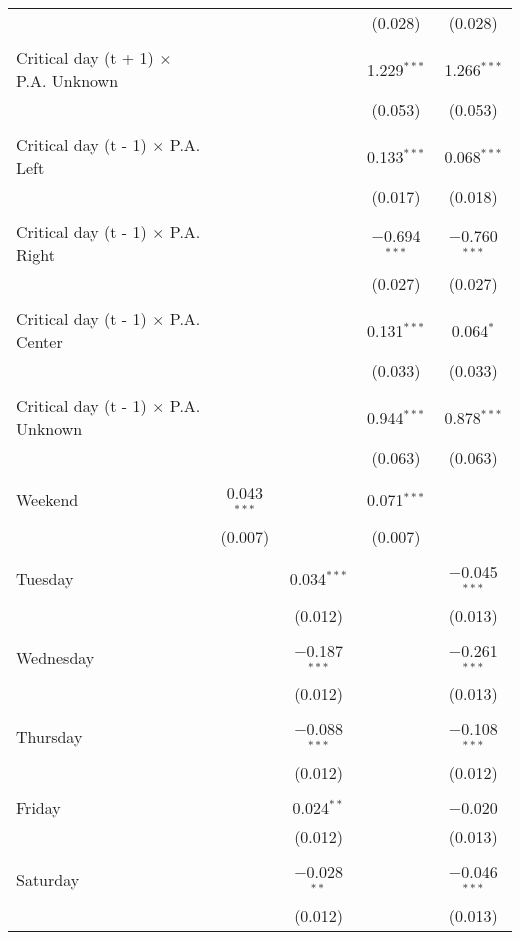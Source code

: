 \documentclass[
]{article}
\begin{document}
\begin{table}[!htbp]
{\begin{tabular}{@{\extracolsep{5pt}}lcccc}
  &  &  & (0.028) & (0.028) \\ 
  & & & & \\ 
 Critical day (t + 1) $\times$ P.A. Unknown &  &  & 1.229$^{***}$ & 1.266$^{***}$ \\ 
  &  &  & (0.053) & (0.053) \\ 
  & & & & \\ 
 Critical day (t - 1) $\times$ P.A. Left &  &  & 0.133$^{***}$ & 0.068$^{***}$ \\ 
  &  &  & (0.017) & (0.018) \\ 
  & & & & \\ 
 Critical day (t - 1) $\times$ P.A. Right &  &  & $-$0.694$^{***}$ & $-$0.760$^{***}$ \\ 
  &  &  & (0.027) & (0.027) \\ 
  & & & & \\ 
 Critical day (t - 1) $\times$ P.A. Center &  &  & 0.131$^{***}$ & 0.064$^{*}$ \\ 
  &  &  & (0.033) & (0.033) \\ 
  & & & & \\ 
 Critical day (t - 1) $\times$ P.A. Unknown &  &  & 0.944$^{***}$ & 0.878$^{***}$ \\ 
  &  &  & (0.063) & (0.063) \\ 
  & & & & \\ 
 Weekend & 0.043$^{***}$ &  & 0.071$^{***}$ &  \\ 
  & (0.007) &  & (0.007) &  \\ 
  & & & & \\ 
 Tuesday &  & 0.034$^{***}$ &  & $-$0.045$^{***}$ \\ 
  &  & (0.012) &  & (0.013) \\ 
  & & & & \\ 
 Wednesday &  & $-$0.187$^{***}$ &  & $-$0.261$^{***}$ \\ 
  &  & (0.012) &  & (0.013) \\ 
  & & & & \\ 
 Thursday &  & $-$0.088$^{***}$ &  & $-$0.108$^{***}$ \\ 
  &  & (0.012) &  & (0.012) \\ 
  & & & & \\ 
 Friday &  & 0.024$^{**}$ &  & $-$0.020 \\ 
  &  & (0.012) &  & (0.013) \\ 
  & & & & \\ 
 Saturday &  & $-$0.028$^{**}$ &  & $-$0.046$^{***}$ \\ 
  &  & (0.012) &  & (0.013) \\ 

\end{tabular}}
\end{table}
\end{document}
